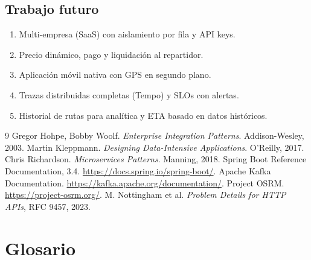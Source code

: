 \documentclass[conference]{IEEEtran}
\begin{document}
\subsection{Trabajo futuro}

\begin{enumerate}[leftmargin=1.2cm]
  \item Multi-empresa (SaaS) con aislamiento por fila y API keys.
  \item Precio dinámico, pago y liquidación al repartidor.
  \item Aplicación móvil nativa con GPS en segundo plano.
  \item Trazas distribuidas completas (Tempo) y SLOs con alertas.
  \item Historial de rutas para analítica y ETA basado en datos históricos.
\end{enumerate}

\clearpage
\begin{thebibliography}{9}
 Gregor Hohpe, Bobby Woolf. \emph{Enterprise Integration Patterns}. Addison-Wesley, 2003.
 Martin Kleppmann. \emph{Designing Data-Intensive Applications}. O'Reilly, 2017.
 Chris Richardson. \emph{Microservices Patterns}. Manning, 2018.
 Spring Boot Reference Documentation, 3.4. \url{https://docs.spring.io/spring-boot/}.
 Apache Kafka Documentation. \url{https://kafka.apache.org/documentation/}.
 Project OSRM. \url{https://project-osrm.org/}.
 M. Nottingham et al. \emph{Problem Details for HTTP APIs}, RFC 9457, 2023.
\end{thebibliography}

\clearpage
\appendices
\clearpage
\section{Glosario}
\end{document}
